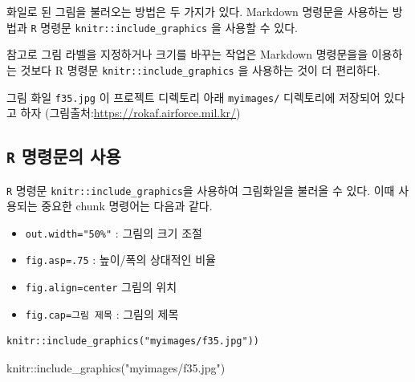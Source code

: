 \documentclass[
]{book}
\newenvironment{Shaded}{\begin{snugshade}}{\end{snugshade}}
\newcommand{\FunctionTok}[1]{\textcolor[rgb]{0.00,0.00,0.00}{#1}}
\newcommand{\NormalTok}[1]{#1}
\newcommand{\SpecialCharTok}[1]{\textcolor[rgb]{0.00,0.00,0.00}{#1}}
\newcommand{\StringTok}[1]{\textcolor[rgb]{0.31,0.60,0.02}{#1}}
\providecommand{\tightlist}{%
  \setlength{\itemsep}{0pt}\setlength{\parskip}{0pt}}
\theoremstyle{definition}
\theoremstyle{definition}
\theoremstyle{definition}
\theoremstyle{definition}
\theoremstyle{remark}
\begin{document}
화일로 된 그림을 불러오는 방법은 두 가지가 있다. Markdown 명령문을 사용하는 방법과 \texttt{R} 명령문 \texttt{knitr::include\_graphics} 을 사용할 수 있다.

참고로 그림 라벨을 지정하거나 크기를 바꾸는 작업은 Markdown 명령문을을 이용하는 것보다 R 명령문 \texttt{knitr::include\_graphics} 을 사용하는 것이 더 편리하다.

그림 화일 \texttt{f35.jpg} 이 프로젝트 디렉토리 아래 \texttt{myimages/} 디렉토리에 저장되어 있다고 하자 (그림출처:\url{https://rokaf.airforce.mil.kr/})

\hypertarget{r-uxba85uxb839uxbb38uxc758-uxc0acuxc6a9}{%
\subsection{\texorpdfstring{\texttt{R} 명령문의 사용}{R 명령문의 사용}}\label{r-uxba85uxb839uxbb38uxc758-uxc0acuxc6a9}}

\texttt{R} 명령문 \texttt{knitr::include\_graphics}을 사용하여 그림화일을 불러올 수 있다. 이때 사용되는
중요한 chunk 명령어는 다음과 같다.

\begin{itemize}
\tightlist
\item
  \texttt{out.width="50\%"} : 그림의 크기 조절
\item
  \texttt{fig.asp=.75} : 높이/폭의 상대적인 비율
\item
  \texttt{fig.align=\textquotesingle{}center\textquotesingle{}} 그림의 위치
\item
  \texttt{fig.cap=\textquotesingle{}그림\ 제목\textquotesingle{}} : 그림의 제목
\end{itemize}

\begin{verbatim}
knitr::include_graphics("myimages/f35.jpg"))
\end{verbatim}

\begin{Shaded}
\begin{Highlighting}[]
\NormalTok{knitr}\SpecialCharTok{::}\FunctionTok{include\_graphics}\NormalTok{(}\StringTok{"myimages/f35.jpg"}\NormalTok{)}
\end{Highlighting}
\end{Shaded}
\end{document}
